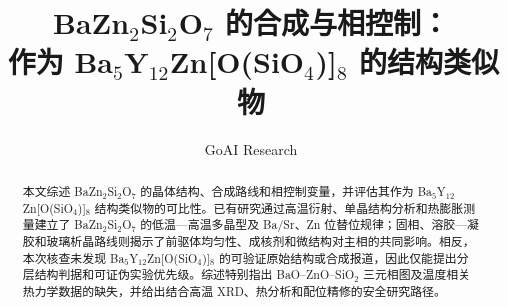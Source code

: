 \documentclass[11pt,fontset=fandol]{ctexart}
\title{BaZn$_2$Si$_2$O$_7$ 的合成与相控制：\texorpdfstring{\\}{ }\,作为 Ba$_5$Y$_{12}$Zn[O(SiO$_4$)]$_8$ 的结构类似物}
\author{GoAI Research}
\date{}
\begin{document}
\maketitle

\begin{abstract}
本文综述 BaZn$_2$Si$_2$O$_7$ 的晶体结构、合成路线和相控制变量，并评估其作为 Ba$_5$Y$_{12}$Zn[O(SiO$_4$)]$_8$ 结构类似物的可比性。已有研究通过高温衍射、单晶结构分析和热膨胀测量建立了 BaZn$_2$Si$_2$O$_7$ 的低温—高温多晶型及 Ba\slash Sr、Zn 位替位规律；固相、溶胶—凝胶和玻璃析晶路线则揭示了前驱体均匀性、成核剂和微结构对主相的共同影响。相反，本次核查未发现 Ba$_5$Y$_{12}$Zn[O(SiO$_4$)]$_8$ 的可验证原始结构或合成报道，因此仅能提出分层结构判据和可证伪实验优先级。综述特别指出 BaO--ZnO--SiO$_2$ 三元相图及温度相关热力学数据的缺失，并给出结合高温 XRD、热分析和配位精修的安全研究路径。
\end{abstract}









\clearpage


\end{document}
